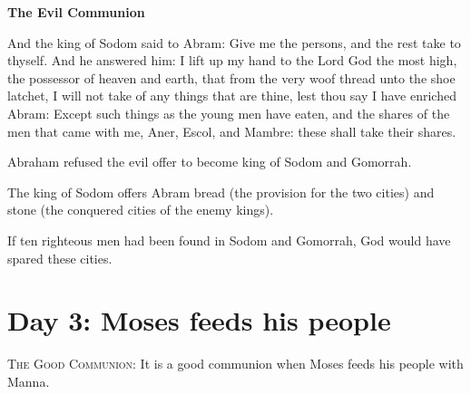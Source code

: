 \textbf{The Evil Communion}

And the king of Sodom said to Abram: Give me the persons, and the rest take to thyself. And he answered him: I lift up my hand to the Lord God the most high, the possessor of heaven and earth, that from the very woof thread unto the shoe latchet, I will not take of any things that are thine, lest thou say I have enriched Abram: Except such things as the young men have eaten, and the shares of the men that came with me, Aner, Escol, and Mambre: these shall take their shares. 

Abraham refused the evil offer to become king of Sodom and Gomorrah.

The king of Sodom offers Abram bread (the provision for the two cities) and stone (the conquered cities of the enemy kings).

\begin{quotex}
If ten righteous men had been found in Sodom and Gomorrah, God would have spared these cities. 

\end{quotex}

\section{Day 3: Moses feeds his people}
\textsc{The Good Communion}:
It is a good communion when Moses feeds his people with Manna.

